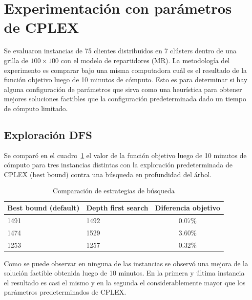 \documentclass[10pt]{article}
\begin{document}
\clearpage

\section{Experimentación con parámetros de CPLEX}

Se evaluaron instancias de 75 clientes distribuidos en 7 clústers dentro de una grilla de $100 \times 100$ con el modelo de repartidores (MR). La metodología del experimento es comparar bajo una misma computadora cuál es el resultado de la función objetivo luego de 10 minutos de cómputo. Esto es para determinar si hay alguna configuración de parámetros que sirva como una heurística para obtener mejores soluciones factibles que la configuración predeterminada dado un tiempo de cómputo limitado.

\subsection{Exploración DFS}

Se comparó en el cuadro~\ref{tab:comparacion_busqueda_dfs} el valor de la función objetivo luego de 10 minutos de cómputo para tres instancias distintas con la exploración predeterminada de CPLEX (best bound) contra una búsqueda en profundidad del árbol.

\begin{table}[htbp]
	\centering
	\begin{tabular}{llc}
		\hline
		\textbf{Best bound (default)} & \textbf{Depth first search} & \textbf{Diferencia objetivo} \\
		\hline
		1491 & 1492 & 0.07\% \\
		1474 & 1529 & 3.60\% \\
		1253 & 1257 & 0.32\% \\
		\hline
	\end{tabular}
	\caption{Comparación de estrategias de búsqueda}
	\label{tab:comparacion_busqueda_dfs}
\end{table}

Como se puede observar en ninguna de las instancias se observó una mejora de la solución factible obtenida luego de 10 minutos. En la primera y última instancia el resultado es casi el mismo y en la segunda el considerablemente mayor que los parámetros predeterminados de CPLEX.
\end{document}
